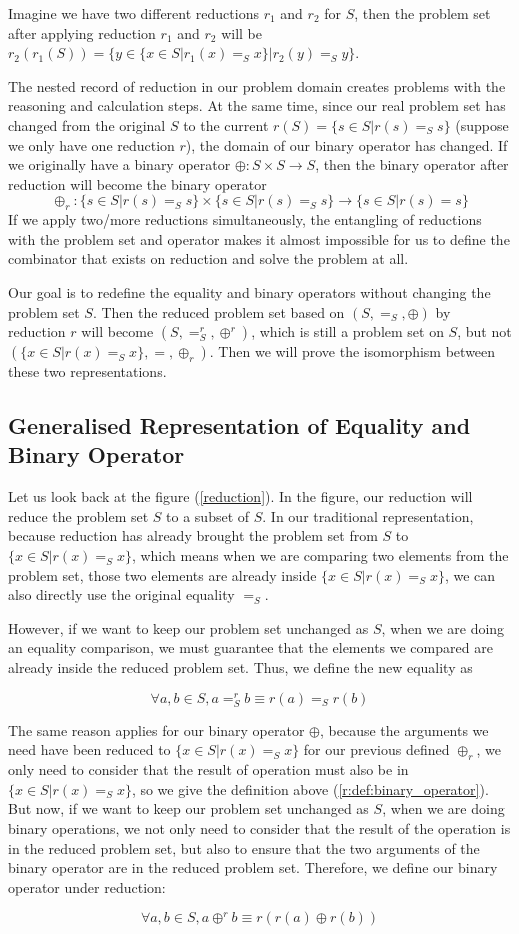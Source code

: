 \documentclass[a4paper,12pt,twoside,openright]{report}
\newcommand{\e}[2]{
\begin{equation}
  \label{#1} 
  #2
\end{equation}
}
\begin{document}
Imagine we have two different reductions $r_1$ and $r_2$ for $S$, then the problem set after applying reduction $r_1$ and $r_2$ will be $r_2(r_1(S)) = \{y\in \{x \in S | r_1(x) =_S x\}|r_2(y)=_S y\}$. 

The nested  record of reduction in our problem domain creates problems with the reasoning and calculation steps. 
At the same time, since our real problem set has changed from the original $S$ to the current $r(S) = \{s\in S|r(s)=_S s\}$ (suppose we only have one reduction $r$), the domain of our binary operator has changed. If we originally have a binary operator $\oplus : S\times S \rightarrow S$, then the binary operator after reduction will become the binary operator \[\oplus_r : \{s\in S|r(s)=_S s\} \times \{s\in S|r(s)=_S s\} \rightarrow \{s\in S|r(s)= s\}\] If we apply two/more reductions simultaneously, the entangling of reductions with the problem set and operator makes it almost impossible for us to define the combinator that exists on reduction and solve the problem at all.

Our goal is to redefine the equality and binary operators without changing the problem set $S$. 
Then the reduced problem set based on $(S,=_S,\oplus)$ by reduction $r$ will become $(S,=^r_S,\oplus^r)$, which is still a problem set on $S$, but not $(\{x \in S | r(x) =_S x\}, =,\oplus_r)$. 
Then we will prove the isomorphism between these two representations.

\subsection{Generalised Representation of Equality and Binary Operator}
Let us look back at the figure (\ref{reduction}). In the figure, our reduction will reduce the problem set $S$ to a subset of $S$. In our traditional representation, because reduction has already brought the problem set from $S$ to $\{x \in S | r(x) =_S x\}$, which means when we are comparing two elements from the problem set, those two elements are already inside $\{x \in S | r(x) =_S x\}$, we can also directly use the original equality $=_S$.

However, if we want to keep our problem set unchanged as $S$, when we are doing an equality comparison, we must guarantee that the elements we compared are already inside the reduced problem set. Thus, we define the new equality as
\e{gr:def:eq}{\forall a,b \in S, a =^r_S b \equiv r(a) =_S r(b)}

The same reason applies for our binary operator  $\oplus$, because the arguments we need have been reduced to $\{x \in S | r(x) =_S x \}$ for our previous defined $\oplus_r$, we only need to consider that the result of operation must also be in $\{x \in S | r(x) =_S x\}$, so we give the definition above (\ref{r:def:binary_operator}).
But now, if we want to keep our problem set unchanged as $S$, when we are doing binary operations, we not only need to consider that the result of the operation is in the reduced problem set, but also to ensure that the two arguments of the binary operator are in the reduced problem set. Therefore, we define our binary operator under reduction:
\e{gr:def:binary_operator}{\forall a,b \in S, a \oplus^r b \equiv r(r(a) \oplus r(b))}
\end{document}
